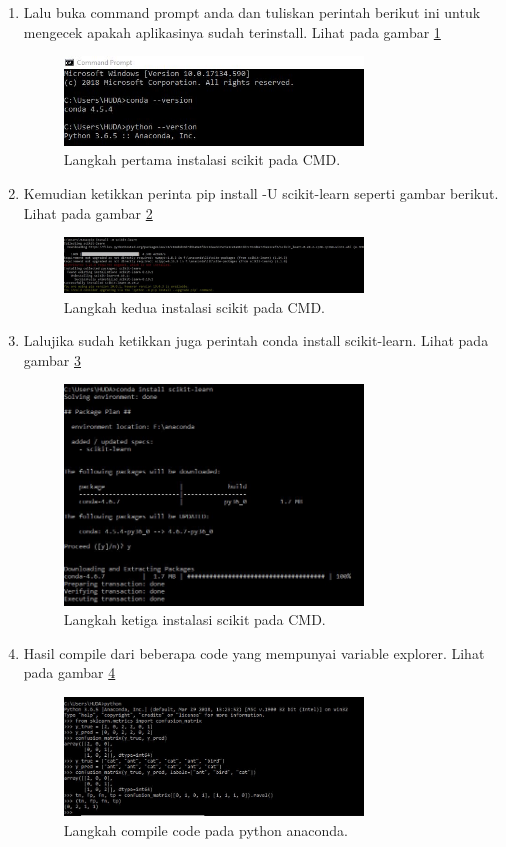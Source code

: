 \begin{enumerate}
\item Lalu buka command prompt anda dan tuliskan perintah berikut ini untuk mengecek apakah aplikasinya sudah terinstall. Lihat pada gambar \ref{6}
\begin{figure}[!htbp]\centerline{\includegraphics[width=0.75\textwidth]{figures/huda/6.JPG}}\caption{Langkah pertama instalasi scikit pada CMD.}\label{6}\end{figure}
\item Kemudian ketikkan perinta pip install -U scikit-learn seperti gambar berikut. Lihat pada gambar \ref{7}
\begin{figure}[!htbp]\centerline{\includegraphics[width=0.75\textwidth]{figures/huda/7.JPG}}\caption{Langkah kedua instalasi scikit pada CMD.}\label{7}\end{figure}
\item Lalujika sudah  ketikkan juga perintah conda install scikit-learn. Lihat pada gambar \ref{8}
\begin{figure}[!htbp]\centerline{\includegraphics[width=0.75\textwidth]{figures/huda/8.JPG}}\caption{Langkah ketiga instalasi scikit pada CMD.}\label{8}\end{figure}
\item Hasil compile dari beberapa code yang mempunyai variable explorer. Lihat pada gambar \ref{9}
\begin{figure}[!htbp]\centerline{\includegraphics[width=0.75\textwidth]{figures/huda/9.JPG}}\caption{Langkah compile code pada python anaconda.}\label{9}\end{figure}
\end{enumerate}
